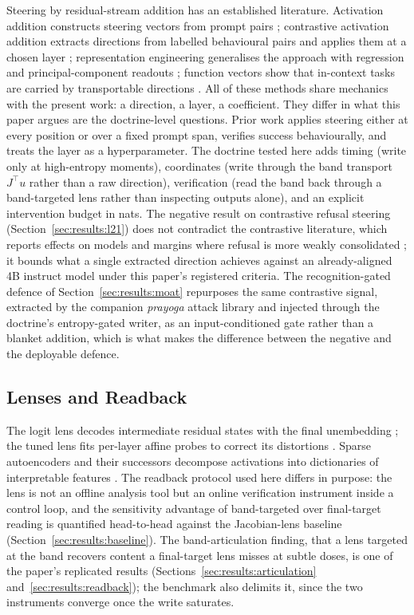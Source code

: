 Steering by residual-stream addition has an established literature. Activation addition constructs steering vectors from prompt pairs \cite{Turner2023}; contrastive activation addition extracts directions from labelled behavioural pairs and applies them at a chosen layer \cite{Rimsky2024}; representation engineering generalises the approach with regression and principal-component readouts \cite{Zou2023RepE}; function vectors show that in-context tasks are carried by transportable directions \cite{Todd2024}. All of these methods share mechanics with the present work: a direction, a layer, a coefficient. They differ in what this paper argues are the doctrine-level questions. Prior work applies steering either at every position or over a fixed prompt span, verifies success behaviourally, and treats the layer as a hyperparameter. The doctrine tested here adds timing (write only at high-entropy moments), coordinates (write through the band transport $J^{\top}u$ rather than a raw direction), verification (read the band back through a band-targeted lens rather than inspecting outputs alone), and an explicit intervention budget in nats. The negative result on contrastive refusal steering (Section~\ref{sec:results:l21}) does not contradict the contrastive literature, which reports effects on models and margins where refusal is more weakly consolidated \cite{Rimsky2024,Arditi2024}; it bounds what a single extracted direction achieves against an already-aligned 4B instruct model under this paper's registered criteria. The recognition-gated defence of Section~\ref{sec:results:moat} repurposes the same contrastive signal, extracted by the companion \emph{prayoga} attack library and injected through the doctrine's entropy-gated writer, as an input-conditioned gate rather than a blanket addition, which is what makes the difference between the negative and the deployable defence.

\subsection{Lenses and Readback}

The logit lens decodes intermediate residual states with the final unembedding \cite{Nostalgebraist2020}; the tuned lens fits per-layer affine probes to correct its distortions \cite{Belrose2023}. Sparse autoencoders and their successors decompose activations into dictionaries of interpretable features \cite{Bricken2023,Cunningham2023,Templeton2024}. The readback protocol used here differs in purpose: the lens is not an offline analysis tool but an online verification instrument inside a control loop, and the sensitivity advantage of band-targeted over final-target reading is quantified head-to-head against the Jacobian-lens baseline (Section~\ref{sec:results:baseline}). The band-articulation finding, that a lens targeted at the band recovers content a final-target lens misses at subtle doses, is one of the paper's replicated results (Sections~\ref{sec:results:articulation} and~\ref{sec:results:readback}); the benchmark also delimits it, since the two instruments converge once the write saturates.

